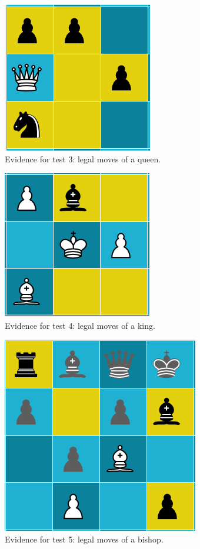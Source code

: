 \begin{figure}
	\centering
	\includegraphics{images/screenshots/test-3}
	\caption{Evidence for test 3: legal moves of a queen.}
	\label{test-3}
\end{figure}
\begin{figure}
	\centering
	\includegraphics{images/screenshots/test-4}
	\caption{Evidence for test 4: legal moves of a king.}
	\label{test-4}
\end{figure}
\begin{figure}
	\centering
	\includegraphics{images/screenshots/test-5}
	\caption{Evidence for test 5: legal moves of a bishop.}
	\label{test-5}
\end{figure}

